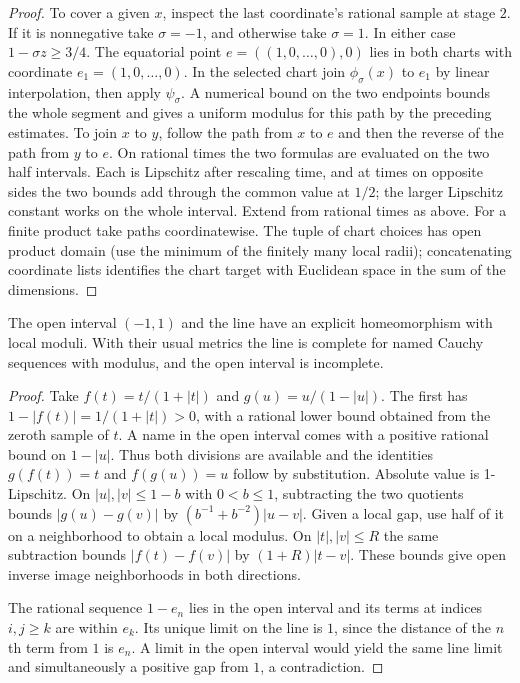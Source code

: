 \begin{proof}
To cover a given $x$, inspect the last coordinate's rational sample at
stage $2$. If it is nonnegative take $\sigma=-1$, and otherwise take
$\sigma=1$. In either case $1-\sigma z\ge3/4$. The equatorial point
$e=((1,0,\ldots,0),0)$ lies in both charts with coordinate
$e_1=(1,0,\ldots,0)$. In the selected chart join $\phi_\sigma(x)$ to
$e_1$ by linear interpolation, then apply $\psi_\sigma$. A numerical
bound on the two endpoints bounds the whole segment and gives a uniform
modulus for this path by the preceding estimates. To join $x$ to $y$,
follow the path from $x$ to $e$ and then the reverse of the path from $y$
to $e$. On rational times the two formulas are evaluated on the two
half intervals. Each is Lipschitz after rescaling time, and at times on
opposite sides the two bounds add through the common value at $1/2$;
the larger Lipschitz constant works on the whole interval. Extend from
rational times as above. For a finite product take paths coordinatewise.
The tuple of chart choices has open product domain (use the minimum of
the finitely many local radii); concatenating coordinate lists identifies
the chart target with Euclidean space in the sum of the dimensions.
\end{proof}

\begin{proposition}\label{idx-metric502}
The open interval $(-1,1)$ and the line have an explicit homeomorphism
with local moduli. With their usual metrics the line is complete for named
Cauchy sequences with modulus, and the open interval is incomplete.
\end{proposition}
\begin{proof}
Take $f(t)=t/(1+|t|)$ and $g(u)=u/(1-|u|)$. The first has
$1-|f(t)|=1/(1+|t|)>0$, with a rational lower bound obtained from the
zeroth sample of $t$. A name in the open interval comes with a positive
rational bound on $1-|u|$. Thus both divisions are available and the
identities $g(f(t))=t$ and $f(g(u))=u$ follow by substitution.
Absolute value is 1-Lipschitz. On $|u|,|v|\le1-b$ with $0<b\le1$,
subtracting the two quotients bounds $|g(u)-g(v)|$ by
$(b^{-1}+b^{-2})|u-v|$. Given a local gap, use half of it on a
neighborhood to obtain a local modulus. On $|t|,|v|\le R$ the same
subtraction bounds $|f(t)-f(v)|$ by $(1+R)|t-v|$.
These bounds give open inverse image neighborhoods in both directions.

The rational sequence $1-e_n$ lies in the open interval and its terms
at indices $i,j\ge k$ are within $e_k$. Its unique limit on the line is
$1$, since the distance of the $n$th term from $1$ is $e_n$. A limit
in the open interval would yield the same line limit and simultaneously
a positive gap from $1$, a contradiction.
\end{proof}


